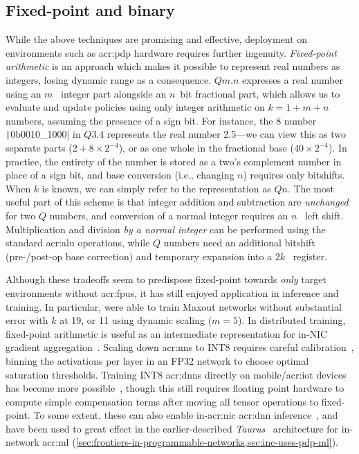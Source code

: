 \subsection{Fixed-point and binary}\label{sec:fixed-point-and-binary}
While the above techniques are promising and effective, deployment on environments such as \gls{acr:pdp} hardware requires further ingenuity.
\emph{Fixed-point arithmetic} is an approach which makes it possible to represent real numbers as integers, losing dynamic range as a consequence.
$Qm.n$ expresses a real number using an $m$~\unit{\bit} integer part alongside an $n$~\unit{bit} fractional part, which allows us to evaluate and update policies using only integer arithmetic on $k=1+m+n$~\unit{\bit} numbers, assuming the presence of a sign bit.
For instance, the \qty{8}{\bit} number \texttt|0b0010_1000| in $Q3.4$ represents the real number \num{2.5}---we can view this as two separate parts ($2 + 8\times2^{-4}$), or as one whole in the fractional base ($40\times2^{-4}$).
In practice, the entirety of the number is stored as a two's complement number in place of a sign bit, and base conversion (i.e., changing $n$) requires only bitshifts.
When $k$ is known, we can simply refer to the representation as $Qn$.
The most useful part of this scheme is that integer addition and subtraction are \emph{unchanged} for two $Q$ numbers, and conversion of a normal integer requires an $n$~\unit{\bit} left shift.
Multiplication and division \emph{by a normal integer} can be performed using the standard \gls{acr:alu} operations, while $Q$ numbers need an additional bitshift (pre-/post-op base correction) and temporary expansion into a $2k$~\unit{\bit} register.

Although these tradeoffs seem to predispose fixed-point towards \emph{only} target environments without \glspl{acr:fpu}, it has still enjoyed application in inference and training.
In particular, \textcite{DBLP:journals/corr/CourbariauxBD14} were able to train Maxout networks without substantial error with $k$ at \qty{19}{\bit}, or \qty{11}{\bit} using dynamic scaling ($m=5$).
In distributed training, fixed-point arithmetic is useful as an intermediate representation for in-NIC gradient aggregation~\parencite{DBLP:conf/nsdi/SapioC0NKKKMPR21,DBLP:conf/nsdi/LaoLMCWAS21}.
Scaling down \glspl{acr:nn} to INT8 requires careful calibration~\parencite{tensorrt-8bit}, binning the activations per layer in an FP32 network to choose optimal saturation thresholds.
Training INT8 \glspl{acr:dnn} directly on mobile/\gls{acr:iot} devices has become more possible~\parencite{DBLP:conf/usenix/Zhou0QGXZGLZ21}, though this still requires floating point hardware to compute simple compensation terms after moving all tensor operations to fixed-point.
To some extent, these can also enable in-\gls{acr:nic} \gls{acr:dnn} inference~\parencite{langlet-ml-netronome}, and have been used to great effect in the earlier-described \emph{Taurus}~\parencite{DBLP:journals/corr/abs-2002-08987,DBLP:conf/asplos/SwamyR0GO22} architecture for in-network \gls{acr:ml} (\cref{sec:frontiers-in-programmable-networks,sec:inc-uses-pdp-ml}).

